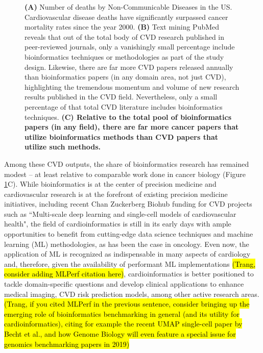 \documentclass[letter]{bioinfo}
\begin{document}
\begin{figure}[!tpb]
	\caption{\textbf{(A)} Number of deaths by Non-Communicable Diseases in the US.  Cardiovascular disease deaths have significantly surpassed cancer mortality rates since the year 2000.  \textbf{(B)} Text mining PubMed reveals that out of the total body of CVD research published in peer-reviewed journals, only a vanishingly small percentage include bioinformatics techniques or methodologies as part of the study design.  Likewise, there are far more CVD papers released annually than bioinformatics papers (in any domain area, not just CVD), highlighting the tremendous momentum and volume of new research results published in the CVD field.  Nevertheless, only a small percentage of that total CVD literature includes bioinformatics techniques.  \textbf{(C) Relative to the total pool of bioinformatics papers (in any field), there are far more cancer papers that utilize bioinformatics methods than CVD papers that utilize such methods.}}
	\label{fig:figure1}
\end{figure}


Among these CVD outputs, the share of bioinformatics research has remained modest -- at least relative to comparable work done in cancer biology (Figure \ref{fig:figure1}C). While bioinformatics is at the center of precision medicine \citep{Gomez-Lopez:2017:Precision} and cardiovascular research is at the forefront of existing precision medicine initiatives, including recent Chan Zuckerberg Biohub funding for CVD projects such as ``Multi-scale deep learning and single-cell models of cardiovascular health", the field of cardioinformatics is still in its early days with ample opportunities to benefit from cutting-edge data science techniques and machine learning (ML) methodologies, as has been the case in oncology.  Even now, the application of ML is recognized as indispensable in many aspects of cardiology \citep{Shameer:2017:Translational,Shameer:2018:Machine} and, therefore, given the availability of performant ML implementations \hl{(Trang, consider adding MLPerf citation here)}, cardioinformatics is better positioned to tackle domain-specific questions and develop clinical applications to enhance medical imaging, CVD risk prediction models, among other active research areas. \hl{(Trang, if you cited MLPerf in the previous sentence, consider bringing up the emerging role of bioinformatics benchmarking in general (and its utility for cardioinformatics), citing for example the recent UMAP single-cell paper by Becht et al., and how Genome Biology will even feature a special issue for genomics benchmarking papers in 2019)}  
\end{document}
